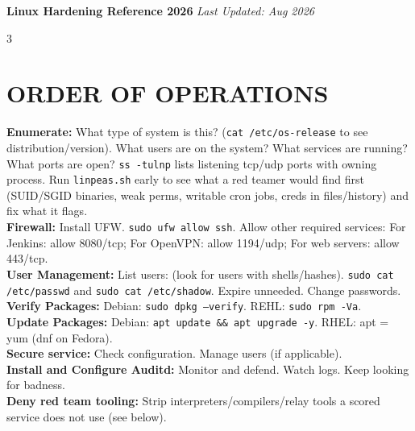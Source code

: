 \documentclass[7pt,landscape]{article}
\begin{document}
\textbf{\textcolor{linuxc}{Linux} Hardening Reference 2026} \hfill \textit{Last Updated: Aug 2026}
\raggedcolumns
\begin{multicols*}{3}

\section{ORDER OF OPERATIONS}
\textbf{Enumerate:}
What type of system is this? (\texttt{cat /etc/os-release} to see distribution/version).
What users are on the system? What services are running? What ports are open? \texttt{ss -tulnp} lists listening tcp/udp ports with owning process. Run \texttt{linpeas.sh} early to see what a red teamer would find first (SUID/SGID binaries, weak perms, writable cron jobs, creds in files/history) and fix what it flags. \\
\textbf{Firewall:}
Install UFW. \texttt{sudo ufw allow ssh}. Allow other required services: For Jenkins: allow 8080/tcp; For OpenVPN: allow 1194/udp; For web servers: allow 443/tcp. \\
\textbf{User Management:}
List users: (look for users with shells/hashes). \texttt{sudo cat /etc/passwd} and \texttt{sudo cat /etc/shadow}. Expire unneeded. Change passwords. \\
\textbf{Verify Packages:}
Debian: \texttt{sudo dpkg --verify}. REHL: \texttt{sudo rpm -Va}. \\
\textbf{Update Packages:}
Debian: \texttt{apt update \&\& apt upgrade -y}. RHEL: apt = yum (dnf on Fedora). \\
\textbf{Secure service:}
Check configuration. Manage users (if applicable). \\
\textbf{Install and Configure Auditd:}
Monitor and defend. Watch logs. Keep looking for badness. \\
\textbf{Deny red team tooling:}
Strip interpreters/compilers/relay tools a scored service does not use (see below).


\end{multicols*}
\end{document}
